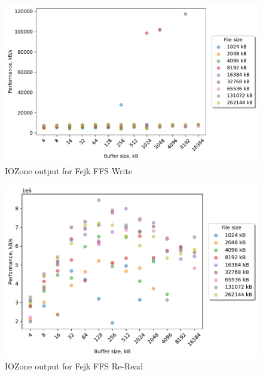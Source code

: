 \begin{figure}[!htb]
	\label{fig:bench_fffs_write}
	\begin{center}
		\includegraphics[width=1.0\textwidth]{figures.nosync/benchmarking/fejk-ffs/Write.pdf}
	\end{center}
	\caption{IOZone output for Fejk FFS Write}
\end{figure}

\begin{figure}[!htb]
	\label{fig:bench_fffs_re_read}
	\begin{center}
		\includegraphics[width=1.0\textwidth]{figures.nosync/benchmarking/fejk-ffs/Re-Read.pdf}
	\end{center}
	\caption{IOZone output for Fejk FFS \mbox{Re-Read}}
\end{figure}

